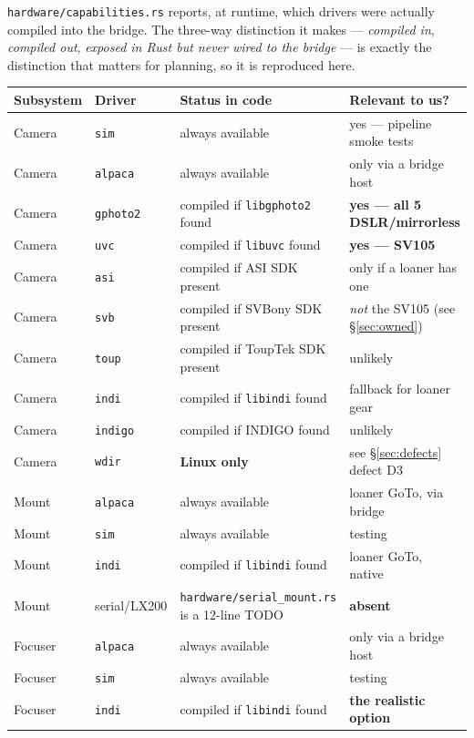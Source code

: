 \documentclass[11pt]{article}
\newcommand{\co}[1]{\texttt{\small #1}}
\begin{document}
\co{hardware/capabilities.rs} reports, at runtime, which drivers were actually
compiled into the bridge. The three-way distinction it makes --- \emph{compiled
in}, \emph{compiled out}, \emph{exposed in Rust but never wired to the bridge}
--- is exactly the distinction that matters for planning, so it is reproduced
here.

\begin{center}
\scriptsize
\begin{tabular}{@{}llp{}p{}@{}}
\toprule
\textbf{Subsystem} & \textbf{Driver} & \textbf{Status in code} & \textbf{Relevant to us?} \\
\midrule
Camera & \co{sim}      & always available & yes --- pipeline smoke tests \\
Camera & \co{alpaca}   & always available & only via a bridge host \\
Camera & \co{gphoto2}  & compiled if \co{libgphoto2} found & \textbf{yes --- all 5 DSLR/mirrorless} \\
Camera & \co{uvc}      & compiled if \co{libuvc} found & \textbf{yes --- SV105} \\
Camera & \co{asi}      & compiled if ASI SDK present & only if a loaner has one \\
Camera & \co{svb}      & compiled if SVBony SDK present & \emph{not} the SV105 (see \S\ref{sec:owned}) \\
Camera & \co{toup}     & compiled if ToupTek SDK present & unlikely \\
Camera & \co{indi}     & compiled if \co{libindi} found & fallback for loaner gear \\
Camera & \co{indigo}   & compiled if INDIGO found & unlikely \\
Camera & \co{wdir}     & \textbf{Linux only} & see \S\ref{sec:defects} defect D3 \\
\midrule
Mount  & \co{alpaca}   & always available & loaner GoTo, via bridge \\
Mount  & \co{sim}      & always available & testing \\
Mount  & \co{indi}     & compiled if \co{libindi} found & loaner GoTo, native \\
Mount  & serial/LX200  & \co{hardware/serial\_mount.rs} is a 12-line TODO & \textbf{absent} \\
\midrule
Focuser & \co{alpaca}  & always available & only via a bridge host \\
Focuser & \co{sim}     & always available & testing \\
Focuser & \co{indi}    & compiled if \co{libindi} found & \textbf{the realistic option} \\

\end{tabular}
\end{center}
\end{document}
